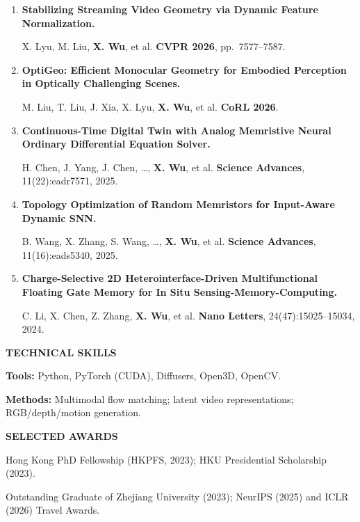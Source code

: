 \documentclass[a4paper]{article}
\newcommand{\cvsection}[1]{%
  \par\vspace{2.0pt}%
  {\color{cvblue}\fontsize{11}{12.2}\selectfont\bfseries\MakeUppercase{#1}}\par
  \vspace{-4pt}{\color{cvblue}\rule{\textwidth}{0.4pt}}\par\vspace{1.0pt}%
}
\begin{document}
{\begin{enumerate}[resume,leftmargin=1.6em,labelsep=0.38em,itemsep=0.4pt,topsep=1.3pt,parsep=0pt,partopsep=0pt]
M. Liu, X. Lyu, T. Ren, P. Dai, \textbf{X. Wu}, et al. \hfill \textbf{ECCV 2026}.
\item \textbf{Stabilizing Streaming Video Geometry via Dynamic Feature Normalization.}\par
X. Lyu, M. Liu, \textbf{X. Wu}, et al. \hfill \textbf{CVPR 2026}, pp.\ 7577--7587.
\item \textbf{OptiGeo: Efficient Monocular Geometry for Embodied Perception in Optically Challenging Scenes.}\par
M. Liu, T. Liu, J. Xia, X. Lyu, \textbf{X. Wu}, et al. \hfill \textbf{CoRL 2026}.
\item \textbf{Continuous-Time Digital Twin with Analog Memristive Neural Ordinary Differential Equation Solver.}\par
H. Chen, J. Yang, J. Chen, \ldots, \textbf{X. Wu}, et al. \hfill \textbf{Science Advances}, 11(22):eadr7571, 2025.
\item \textbf{Topology Optimization of Random Memristors for Input-Aware Dynamic SNN.}\par
B. Wang, X. Zhang, S. Wang, \ldots, \textbf{X. Wu}, et al. \hfill \textbf{Science Advances}, 11(16):eads5340, 2025.
\item \textbf{Charge-Selective 2D Heterointerface-Driven Multifunctional Floating Gate Memory for In Situ Sensing-Memory-Computing.}\par
C. Li, X. Chen, Z. Zhang, \textbf{X. Wu}, et al. \hfill \textbf{Nano Letters}, 24(47):15025--15034, 2024.
\end{enumerate}}

\cvsection{Technical Skills}
\textbf{Tools:} Python, PyTorch (CUDA), Diffusers, Open3D, OpenCV.\par
\textbf{Methods:} Multimodal flow matching; latent video representations; RGB/depth/motion generation.


\cvsection{Selected Awards}
Hong Kong PhD Fellowship (HKPFS, 2023); HKU Presidential Scholarship (2023).\par
Outstanding Graduate of Zhejiang University (2023); NeurIPS (2025) and ICLR (2026) Travel Awards.
\end{document}
